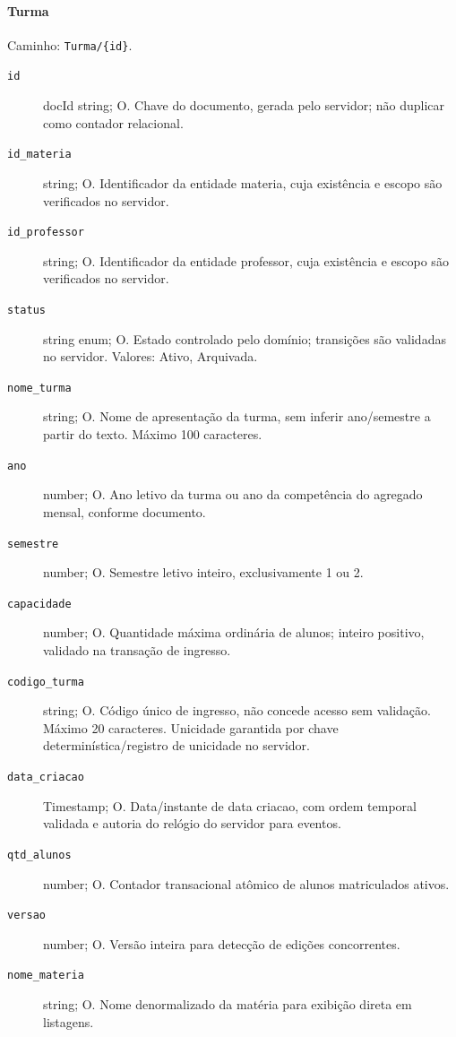 \paragraph{Turma}\mbox{}\par
Caminho: \texttt{Turma/\{id\}}.
\begin{description}
\item[\texttt{id}] docId string; O. Chave do documento, gerada pelo servidor; não duplicar como contador relacional.
\item[\texttt{id\_materia}] string; O. Identificador da entidade materia, cuja existência e escopo são verificados no servidor.
\item[\texttt{id\_professor}] string; O. Identificador da entidade professor, cuja existência e escopo são verificados no servidor.
\item[\texttt{status}] string enum; O. Estado controlado pelo domínio; transições são validadas no servidor. Valores: Ativo, Arquivada.
\item[\texttt{nome\_turma}] string; O. Nome de apresentação da turma, sem inferir ano/semestre a partir do texto. Máximo 100 caracteres.
\item[\texttt{ano}] number; O. Ano letivo da turma ou ano da competência do agregado mensal, conforme documento.
\item[\texttt{semestre}] number; O. Semestre letivo inteiro, exclusivamente 1 ou 2.
\item[\texttt{capacidade}] number; O. Quantidade máxima ordinária de alunos; inteiro positivo, validado na transação de ingresso.
\item[\texttt{codigo\_turma}] string; O. Código único de ingresso, não concede acesso sem validação. Máximo 20 caracteres. Unicidade garantida por chave determinística/registro de unicidade no servidor.
\item[\texttt{data\_criacao}] Timestamp; O. Data/instante de data criacao, com ordem temporal validada e autoria do relógio do servidor para eventos.
\item[\texttt{qtd\_alunos}] number; O. Contador transacional atômico de alunos matriculados ativos.
\item[\texttt{versao}] number; O. Versão inteira para detecção de edições concorrentes.
\item[\texttt{nome\_materia}] string; O. Nome denormalizado da matéria para exibição direta em listagens.
\end{description}

